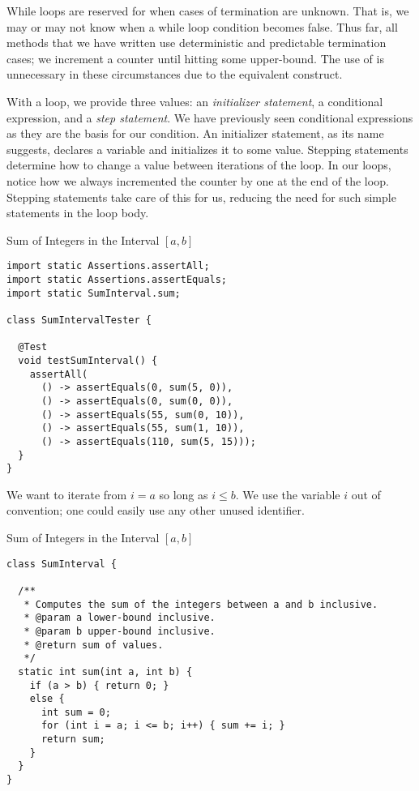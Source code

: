 While loops are reserved for when cases of termination are unknown. That is, we may or may not know when a while loop condition becomes false. Thus far, all methods that we have written use deterministic and predictable termination cases; we increment a counter until hitting some upper-bound. The use of  is unnecessary in these circumstances due to the equivalent  construct.

With a  loop, we provide three values: an \textit{initializer statement}, a conditional expression, and a \textit{step statement}. We have previously seen conditional expressions as they are the basis for our  condition. An initializer statement, as its name suggests, declares a variable and initializes it to some value. Stepping statements determine how to change a value between iterations of the loop. In our  loops, notice how we always incremented the counter by one at the end of the loop. Stepping statements take care of this for us, reducing the need for such simple statements in the loop body.


\begin{cl}{Sum of Integers in the Interval $[a, b]$}
\begin{lstlisting}[language=MyJava]
import static Assertions.assertAll;
import static Assertions.assertEquals;
import static SumInterval.sum;

class SumIntervalTester {

  @Test
  void testSumInterval() {
    assertAll(
      () -> assertEquals(0, sum(5, 0)),
      () -> assertEquals(0, sum(0, 0)),
      () -> assertEquals(55, sum(0, 10)),
      () -> assertEquals(55, sum(1, 10)),
      () -> assertEquals(110, sum(5, 15)));
  }
}
\end{lstlisting}
\end{cl}

We want to iterate from $i = a$ so long as $i \leq b$. We use the variable $i$ out of convention; one could easily use any other unused identifier.

\begin{cl}{Sum of Integers in the Interval $[a, b]$}
\begin{lstlisting}[language=MyJava]
class SumInterval {

  /**
   * Computes the sum of the integers between a and b inclusive.
   * @param a lower-bound inclusive.
   * @param b upper-bound inclusive.
   * @return sum of values.
   */
  static int sum(int a, int b) {
    if (a > b) { return 0; } 
    else {
      int sum = 0;
      for (int i = a; i <= b; i++) { sum += i; }
      return sum;
    }
  }
}
\end{lstlisting}
\end{cl}

